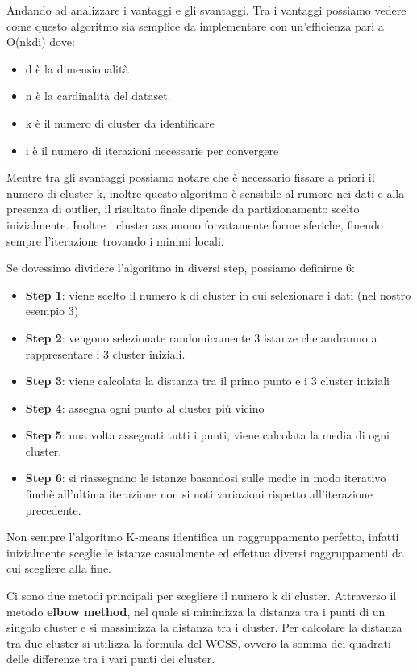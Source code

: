 \documentclass[a4paper]{extarticle}
\begin{document}
Andando ad analizzare i vantaggi e gli svantaggi. Tra i vantaggi possiamo vedere come questo algoritmo sia semplice da implementare con un'efficienza pari a O(nkdi) dove:

\begin{itemize}
\item d è la dimensionalità
\item n è la cardinalità del dataset.
\item k è il numero di cluster da identificare
\item i è il numero di iterazioni necessarie per convergere
\end{itemize}

Mentre tra gli svantaggi possiamo notare che è necessario fissare a priori il numero di cluster k, inoltre questo algoritmo è sensibile al rumore nei dati e alla presenza di outlier, il risultato finale dipende da partizionamento scelto inizialmente. Inoltre i cluster assumono forzatamente forme sferiche, finendo sempre l'iterazione trovando i minimi locali.

Se dovessimo dividere l'algoritmo in diversi step, possiamo definirne 6:
\begin{itemize}
\item \textbf{Step 1}: viene scelto il numero k di cluster in cui selezionare i dati (nel nostro esempio 3)
\item \textbf{Step 2}: vengono selezionate randomicamente 3 istanze che andranno a rappresentare i 3 cluster iniziali.
\item \textbf{Step 3}: viene calcolata la distanza tra il primo punto e i 3 cluster iniziali
\item \textbf{Step 4}: assegna ogni punto al cluster più vicino
\item \textbf{Step 5}: una volta assegnati tutti i punti, viene calcolata la media di ogni cluster.
\item \textbf{Step 6}: si riassegnano le istanze basandosi sulle medie in modo iterativo finchè all'ultima iterazione non si noti variazioni rispetto all'iterazione precedente.
\end{itemize}

Non sempre l'algoritmo K-means identifica un raggruppamento perfetto, infatti inizialmente sceglie le istanze casualmente ed effettua diversi raggruppamenti da cui scegliere alla fine.

Ci sono due metodi principali per scegliere il numero k di cluster. Attraverso il metodo \textbf{elbow method}, nel quale si minimizza la distanza tra i punti di un singolo cluster e si massimizza la distanza tra i cluster. Per calcolare la distanza tra due cluster si utilizza la formula del WCSS, ovvero la somma dei quadrati delle differenze tra i vari punti dei cluster.
\end{document}
